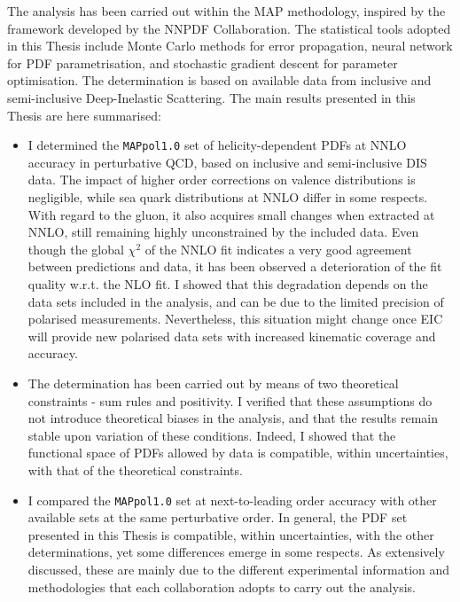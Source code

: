 The analysis has been carried out within the MAP methodology, inspired by the framework developed by the NNPDF Collaboration. The statistical tools adopted in this Thesis include Monte Carlo methods for error propagation, neural network for PDF parametrisation, and stochastic gradient descent for parameter optimisation. The determination is based on available data from inclusive and semi-inclusive Deep-Inelastic Scattering. The main results presented in this Thesis are here summarised:
%
\begin{itemize}
  \item I determined the \texttt{MAPpol1.0} set of helicity-dependent PDFs at NNLO accuracy in perturbative QCD, based on inclusive and semi-inclusive DIS data. The impact of higher order corrections on valence distributions is negligible, while sea quark distributions at NNLO differ in some respects. With regard to the gluon, it also acquires small changes when extracted at NNLO, still remaining highly unconstrained by the included data. Even though the global $\chi^2$ of the NNLO fit indicates a very good agreement between predictions and data, it has been observed a deterioration of the fit quality w.r.t. the NLO fit. I showed that this degradation depends on the data sets included in the analysis, and can be due to the limited precision of polarised measurements. Nevertheless, this situation might change once EIC will provide new polarised data sets with increased kinematic coverage and accuracy.
  \item The determination has been carried out by means of two theoretical constraints - sum rules and positivity. I verified that these assumptions do not introduce theoretical biases in the analysis, and that the results remain stable upon variation of these conditions. Indeed, I showed that the functional space of PDFs allowed by data is compatible, within uncertainties, with that of the theoretical constraints.
  \item I compared the \texttt{MAPpol1.0} set at next-to-leading order accuracy with other available sets \cite{Nocera:2014gqa, Ethier:2017zbq, deFlorian:2009vb} at the same perturbative order. In general, the PDF set presented in this Thesis is compatible, within uncertainties, with the other determinations, yet some differences emerge in some respects. As extensively discussed, these are mainly due to the different experimental information and methodologies that each collaboration adopts to carry out the analysis.
\end{itemize}
%


